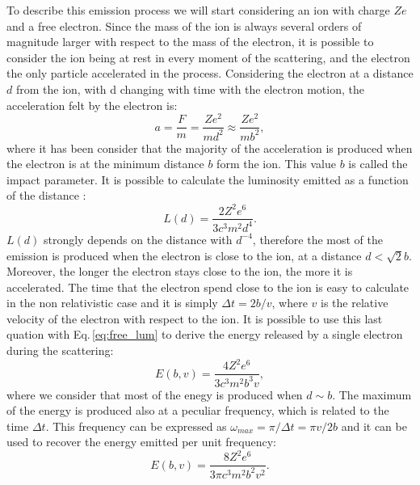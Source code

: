 \documentclass[../thesis.tex]{subfiles}
\begin{document}
To describe this emission process we will start considering an ion with charge $Ze$ and a free electron.
Since the mass of the ion is always several orders of magnitude larger with respect to the mass of the electron, it is possible to consider the ion being at rest in every moment of the scattering, and the electron the only particle accelerated in the process.
Considering the electron at a distance $d$ from the ion, with d changing with time with the electron motion, the acceleration felt by the electron is:
\begin{equation}
    \label{eq:acceleration}
    a = \frac{F}{m} = \frac{Ze^2}{md^2}\approx \frac{Ze^2}{mb^2},
\end{equation}
where it has been consider that the majority of the acceleration is produced when the electron is at the minimum distance $b$ form the ion.
This value $b$ is called the impact parameter.
It is possible to calculate the luminosity emitted as a function of the distance \citep{Deyoung02}:
\begin{equation}
    \label{eq:free_lum}
    L(d) = \frac{2Z^2e^6}{3c^3m^2d^4}.
\end{equation}
$L(d)$ strongly depends on the distance with $d^{-4}$, therefore the most of the emission is produced when the electron is close to the ion, at a distance $d<\sqrt{2}b$.
Moreover, the longer the electron stays close to the ion, the more it is accelerated.
The time that the electron spend close to the ion is easy to calculate in the non relativistic case and it is simply $\Delta t = 2b/v$, where $v$ is the relative velocity of the electron with respect to the ion.
It is possible to use this last quation with Eq.\,\ref{eq:free_lum} to derive the energy released by a single electron during the scattering:
\begin{equation}
    \label{eq:free_energy}
    E(b,v) = \frac{4Z^2e^6}{3c^3m^2b^3v},
\end{equation}
where we consider that most of the enegy is produced when $d\sim b$.
The maximum of the energy is produced also at a peculiar frequency, which is related to the time $\Delta t$.
This frequency can be expressed as $\omega_{max} = \pi/\Delta t = \pi v/2b$ and it can be used to recover the energy emitted per unit frequency:
\begin{equation}
    \label{eq:free_energy_freq}
    E(b,v) = \frac{8Z^2e^6}{3\pi c^3m^2b^2v^2}.
\end{equation}
\end{document}

